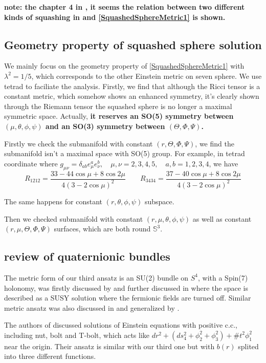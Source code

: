 \documentclass[12pt, a4paper]{article}
\numberwithin{equation}{section}
\newcommand{\be}{\begin{equation}}
\newcommand{\ee}{\end{equation}}
\begin{document}
	
	\textbf{note: the chapter 4 in \cite{Aldazabal:2007is}, it seems the relation between two different kinds of squashing in \cite{Bobev:2017pf} and \ref{SquashedSphereMetric1} is shown. }
	
\subsection{Geometry property of squashed sphere solution}
	We mainly focus on the geometry property of \ref{SquashedSphereMetric1} with $\lambda^2 = 1/5$, which corresponds to the other Einstein metric on seven sphere. We use tetrad to faciliate the analysis. Firstly, we find that although the Ricci tensor is a constant metric, which somehow shows an enhanced symmetry, it's clearly shown through the Riemann tensor the squashed sphere is no longer a maximal symmetric space. Actually, \textbf{it reserves an SO(5) symmetry between $(\mu,\theta,\phi,\psi)$ and an SO(3) symmetry between $(\Theta, \Phi, \Psi)$.}
	
	Firstly we check the submanifold with constant $(r, \Theta, \Phi, \Psi)$, we find the submanifold isn't a maximal space with SO(5) group. For example, in tetrad coordinate where $g_{\mu\nu} = \delta_{ab}e^a_\mu e^b_\nu,\quad \mu,\nu = 2,3,4,5,\quad a,b = 1,2,3,4$, we have
\be
	R_{1212} = \frac{33-44\cos\mu +8\cos2\mu}{4(3-2\cos\mu)^2}\qquad
	R_{3434} = \frac{37-40\cos\mu + 8\cos2\mu}{4(3-2\cos\mu)^2}
\ee

	The same happens for constant $(r, \theta, \phi, \psi)$ subspace.

	Then we checked submanifold with constant $(r, \mu, \theta, \phi, \psi)$ as well as constant $(r,\mu, \Theta, \Phi, \Psi)$ surfaces, which are both round $\mathbb{S}^3$.
	
\subsection{review of quaternionic bundles}
	The metric form of our third ansatz is an SU(2) bundle on $S^4$, with a Spin(7) holonomy,  was firstly discussed by \cite{Page:1985lb}\cite{Gibbons:1990rb} and further discussed in \cite{Bakas:1998gi}\cite{Kanno:1999sh} where the space is described as a SUSY solution where the fermionic fields are turned off. Similar metric ansatz was also discussed in \cite{Cvetic:2001ac}\cite{Gukov:2001sm} and generalized by \cite{Cvetic:2001gh}.
	
	The authors of \cite{Hiragane:2003km} discussed solutions of Einstein equations with positive c.c., including nut, bolt and T-bolt, which acts like $dr^2 + (ds_4^2+\phi_2^2+\phi_3^2) + \# t^2 \phi_1^2$ near the origin. Their ansatz is similar with our third one but with $b(r)$ splited into three different functions.	
	
\end{document}
